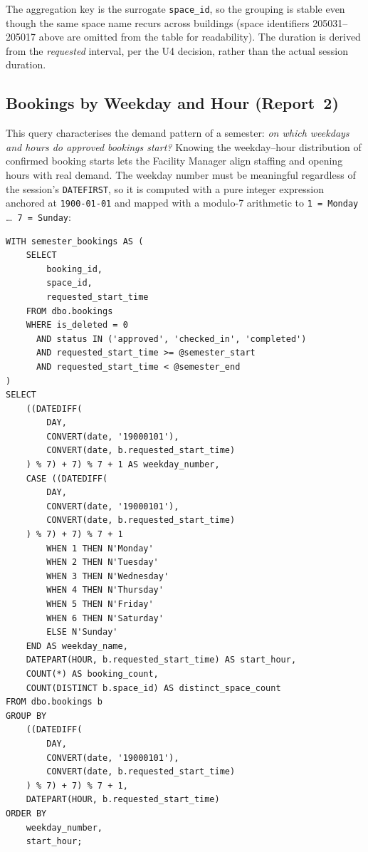 The aggregation key is the surrogate \texttt{space\_id}, so the grouping is
stable even though the same space name recurs across buildings
(space identifiers 205031--205017 above are omitted from the table for
readability). The duration is derived from the \emph{requested} interval, per
the U4 decision, rather than the actual session duration.

\subsection{Bookings by Weekday and Hour (Report~2)}

This query characterises the demand pattern of a semester: \emph{on which
weekdays and hours do approved bookings start?} Knowing the weekday--hour
distribution of confirmed booking starts lets the Facility Manager align
staffing and opening hours with real demand. The weekday number must be
meaningful regardless of the session's \texttt{DATEFIRST}, so it is computed
with a pure integer expression anchored at \texttt{1900-01-01} and mapped with
a modulo-7 arithmetic to \texttt{1 = Monday} \ldots\ \texttt{7 = Sunday}:

\begin{lstlisting}[style=sqlreport]
WITH semester_bookings AS (
    SELECT
        booking_id,
        space_id,
        requested_start_time
    FROM dbo.bookings
    WHERE is_deleted = 0
      AND status IN ('approved', 'checked_in', 'completed')
      AND requested_start_time >= @semester_start
      AND requested_start_time < @semester_end
)
SELECT
    ((DATEDIFF(
        DAY,
        CONVERT(date, '19000101'),
        CONVERT(date, b.requested_start_time)
    ) % 7) + 7) % 7 + 1 AS weekday_number,
    CASE ((DATEDIFF(
        DAY,
        CONVERT(date, '19000101'),
        CONVERT(date, b.requested_start_time)
    ) % 7) + 7) % 7 + 1
        WHEN 1 THEN N'Monday'
        WHEN 2 THEN N'Tuesday'
        WHEN 3 THEN N'Wednesday'
        WHEN 4 THEN N'Thursday'
        WHEN 5 THEN N'Friday'
        WHEN 6 THEN N'Saturday'
        ELSE N'Sunday'
    END AS weekday_name,
    DATEPART(HOUR, b.requested_start_time) AS start_hour,
    COUNT(*) AS booking_count,
    COUNT(DISTINCT b.space_id) AS distinct_space_count
FROM dbo.bookings b
GROUP BY
    ((DATEDIFF(
        DAY,
        CONVERT(date, '19000101'),
        CONVERT(date, b.requested_start_time)
    ) % 7) + 7) % 7 + 1,
    DATEPART(HOUR, b.requested_start_time)
ORDER BY
    weekday_number,
    start_hour;
\end{lstlisting}

